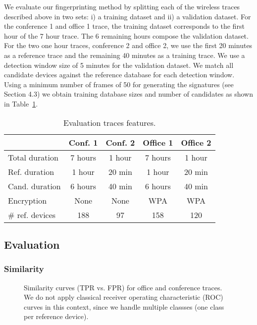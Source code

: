 \documentclass[10pt, conference, compsocconf, letterpaper]{IEEEtran}
\begin{document}
We evaluate our fingerprinting method by splitting each of the wireless traces described above
in two sets: i) a training dataset and ii) a validation dataset.
For the conference 1 and office 1 trace, the training dataset corresponds to the first hour of the 7 hour trace. The 6 remaining hours compose the validation dataset. For the two one hour traces, conference 2 and office 2,  we use
the first 20 minutes as a reference trace and the remaining 40 minutes as a training trace.
We use a detection window size of 5 minutes for the validation dataset. We match all candidate devices against the
reference database for each detection window. Using a minimum number of frames of 50 for generating
the signatures (see Section 4.3) we obtain training database sizes and number of candidates as shown in Table~\ref{tab:traces}.





\begin{table}
{\footnotesize
\begin{center}
\begin{tabular}{l|c|c|c|c}
 & Conf. 1& Conf. 2& Office 1 & Office 2 \\
 \hline
 Total duration & 7 hours & 1 hour& 7 hours & 1 hour \\
 Ref. duration & 1 hour & 20 min& 1 hour & 20 min \\
 Cand. duration & 6 hours & 40 min & 6 hours & 40 min \\
 Encryption & None & None& WPA & WPA \\
\# ref. devices & 188 & 97 & 158 & 120\\
\end{tabular}
\caption{Evaluation traces features.}
\label{tab:traces}
\end{center}
}
\end{table}


\subsection{Evaluation}


\subsubsection{Similarity}

\begin{figure}
\centerline{
}
\hfil
\centerline{
}
\hfil
\centerline{
}
\hfil
\centerline{
}
\caption{Similarity curves (TPR vs. FPR) for office and conference traces. We do not apply  classical receiver operating characteristic (ROC) curves in this context, since we handle multiple classses (one class per reference device).}
\label{fig:SimFPRvsTPR}
\end{figure}
\end{document}
